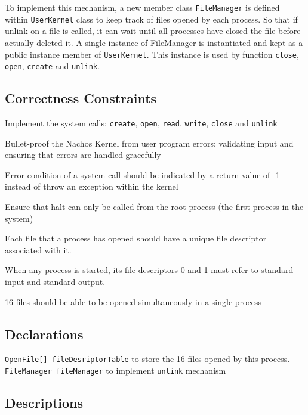 \documentclass{article}
\begin{document}
\begin{spacing}{1.1}
To implement this mechanism, a new member class \texttt{FileManager} is defined within \texttt{UserKernel} class to keep track of files opened by each process. So that if unlink on a file is called, it can wait until all processes have closed the file before actually deleted it. A single instance of FileManager is instantiated and kept as a public instance member of \texttt{UserKernel}. This instance is used by function \texttt{close}, \texttt{open}, \texttt{create} and \texttt{unlink}.



\subsection{Correctness Constraints}

\begin{asparaitem}
\item Implement the system calls: \texttt{create}, \texttt{open}, \texttt{read}, \texttt{write}, \texttt{close} and \texttt{unlink}
\item Bullet-proof the Nachos Kernel from user program errors: validating input and ensuring that errors are handled gracefully
\item Error condition of a system call should be indicated by a return value of -1 instead of throw an exception within the kernel
\item Ensure that halt can only be called from the root process (the first process in the system)
\item Each file that a process has opened should have a unique file descriptor associated with it.
\item When any process is started, its file descriptors 0 and 1 must refer to standard input and standard output.
\item 16 files should be able to be opened simultaneously in a single process
\end{asparaitem}

\subsection{Declarations}

 \texttt{OpenFile[] fileDesriptorTable} to store the 16 files opened by this process.
 \texttt{FileManager fileManager} to implement \texttt{unlink} mechanism

\subsection{Descriptions}


\end{spacing}
\end{document}
